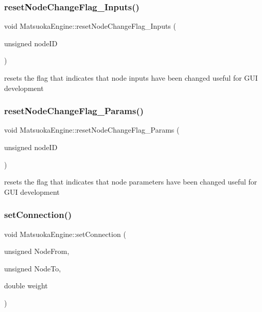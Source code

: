 \subsubsection{\texorpdfstring{reset\+Node\+Change\+Flag\+\_\+\+Inputs()}{resetNodeChangeFlag\_Inputs()}}
{\footnotesize\ttfamily void Matsuoka\+Engine\+::reset\+Node\+Change\+Flag\+\_\+\+Inputs (\begin{DoxyParamCaption}\item[{unsigned}]{node\+ID }\end{DoxyParamCaption})}

resets the flag that indicates that node inputs have been changed useful for G\+UI development \mbox{\label{classMatsuokaEngine_afc55b8350937748e0c0187a08130ca31}} 
\subsubsection{\texorpdfstring{reset\+Node\+Change\+Flag\+\_\+\+Params()}{resetNodeChangeFlag\_Params()}}
{\footnotesize\ttfamily void Matsuoka\+Engine\+::reset\+Node\+Change\+Flag\+\_\+\+Params (\begin{DoxyParamCaption}\item[{unsigned}]{node\+ID }\end{DoxyParamCaption})}

resets the flag that indicates that node parameters have been changed useful for G\+UI development \mbox{\label{classMatsuokaEngine_a716d4e8f1dc446179c5424007995ab59}} 
\subsubsection{\texorpdfstring{set\+Connection()}{setConnection()}\hspace{0.1cm}{\footnotesize\ttfamily [1/2]}}
{\footnotesize\ttfamily void Matsuoka\+Engine\+::set\+Connection (\begin{DoxyParamCaption}\item[{unsigned}]{Node\+From,  }\item[{unsigned}]{Node\+To,  }\item[{double}]{weight }\end{DoxyParamCaption})}

